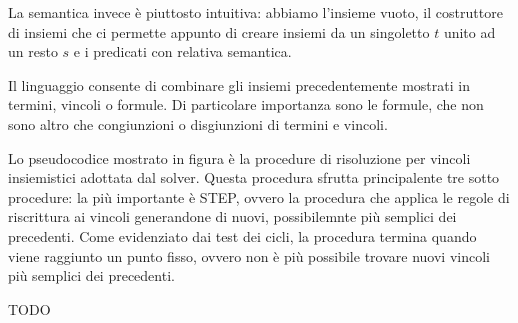 \documentclass[11pt]{article}
\begin{document}
La semantica invece è piuttosto intuitiva: abbiamo l'insieme vuoto, il
costruttore di insiemi che ci permette appunto di creare insiemi da un
singoletto $t$ unito ad un resto $s$ e i predicati con relativa
semantica.

Il linguaggio consente di combinare gli insiemi precedentemente
mostrati in termini, vincoli o formule. Di particolare importanza sono
le formule, che non sono altro che congiunzioni o disgiunzioni di
termini e vincoli.

Lo pseudocodice mostrato in figura è la procedure di risoluzione per
vincoli insiemistici adottata dal solver. Questa procedura sfrutta
principalente tre sotto procedure: la più importante è STEP, ovvero la
procedura che applica le regole di riscrittura ai vincoli generandone
di nuovi, possibilemnte più semplici dei precedenti.  Come evidenziato
dai test dei cicli, la procedura termina quando viene raggiunto un
punto fisso, ovvero non è più possibile trovare nuovi vincoli più
semplici dei precedenti.

TODO
\end{document}
